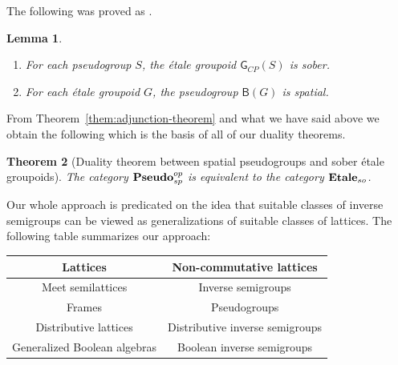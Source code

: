 \documentclass[a4paper]{amsart}
\newtheorem{theorem}{Theorem}[section]
\newtheorem{lemma}[theorem]{Lemma}
\begin{document}
The following was proved as \cite[Proposition 2.12]{LL}.

\begin{lemma}\label{lem:spatial-sober}\mbox{}
\begin{enumerate}
\item For each pseudogroup $S$, the \'etale groupoid $\mathsf{G}_{CP}(S)$ is sober.
\item For each \'etale groupoid $G$, the pseudogroup $\mathsf{B}(G)$ is spatial. 
\end{enumerate}
\end{lemma}

From Theorem~\ref{them:adjunction-theorem} and what we have said above
we obtain the following \cite[Theorem 2.23]{LL} which is the basis of all of our duality theorems.

\begin{theorem}[Duality theorem between spatial pseudogroups and sober \'etale groupoids]
The category  $\mbox{\bf Pseudo}_{sp}^{op}$ is equivalent to the category $\mbox{\bf Etale}_{so}$.
\end{theorem} 







Our whole approach is predicated on the idea that suitable classes of inverse semigroups 
can be viewed as generalizations of suitable classes of lattices. 
The following table summarizes our approach:

\vspace{0.5cm}
\begin{center}
\begin{tabular}{|c||c|}\hline
{\bf Lattices} & {\bf Non-commutative lattices}  \\ \hline \hline
{\small Meet semilattices} & {\small Inverse semigroups} \\ \hline
{\small Frames} & {\small Pseudogroups} \\ \hline
{\small Distributive lattices} & {\small Distributive inverse semigroups}  \\ \hline 
{\small Generalized Boolean algebras} & {\small Boolean inverse semigroups} \\ \hline
\end{tabular}
\end{center}
\vspace{0.5cm}
\end{document}
